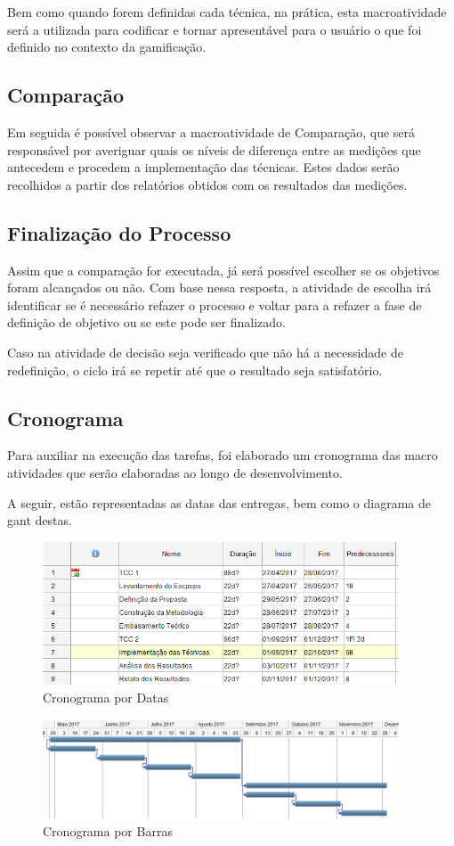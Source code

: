 Bem como quando forem definidas cada técnica, na prática, esta macroatividade
será a utilizada para codificar e tornar apresentável para o usuário o que
foi definido no contexto da gamificação.

\subsection{Comparação}
\label{sub:Comparacao}
Em seguida é possível observar a macroatividade de Comparação, que será
responsável por averiguar quais os níveis de diferença entre as medições que
antecedem e procedem a implementação das técnicas. Estes dados serão recolhidos a
partir dos relatórios obtidos com os resultados das medições.

\subsection{Finalização do Processo}
\label{sub:finalprocess}
Assim que a comparação for executada, já será possível escolher se os objetivos
foram alcançados ou não. Com base nessa resposta, a atividade de escolha irá
identificar se é necessário refazer o processo e voltar para a refazer a fase
de definição de objetivo ou se este pode ser finalizado.

Caso na atividade de decisão seja verificado que não há a necessidade de
redefinição, o ciclo irá se repetir até que o resultado seja satisfatório.

\subsection{Cronograma}
\label{sub:cronograma}
Para auxiliar na execução das tarefas, foi elaborado um cronograma
das macro atividades que serão elaboradas ao longo de desenvolvimento.

A seguir, estão representadas as datas das entregas, bem como o diagrama
de gant destas.

\begin{figure}[h]
    \centering
    \includegraphics[width=400px, scale=1]{figuras/cronogramadatas}
    \caption{Cronograma por Datas}
    \label{fig:cronogramadatas}
\end{figure}

\begin{figure}[h]
    \centering
    \includegraphics[width=400px, scale=1]{figuras/cronogramabarras}
    \caption{Cronograma por Barras}
    \label{fig:cronogramabarras}
\end{figure}
